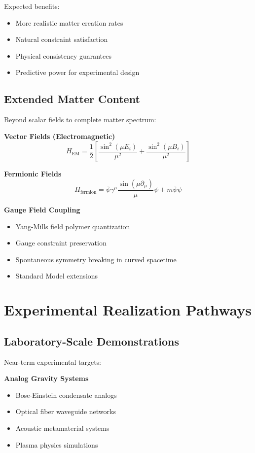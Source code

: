 \documentclass[11pt]{article}
\begin{document}
Expected benefits:
\begin{itemize}
\item More realistic matter creation rates
\item Natural constraint satisfaction
\item Physical consistency guarantees
\item Predictive power for experimental design
\end{itemize}

\subsection{Extended Matter Content}

Beyond scalar fields to complete matter spectrum:

\textbf{Vector Fields (Electromagnetic)}
\begin{equation}
H_{\text{EM}} = \frac{1}{2}\left[\frac{\sin^2(\mu E_i)}{\mu^2} + \frac{\sin^2(\mu B_i)}{\mu^2}\right]
\end{equation}

\textbf{Fermionic Fields}
\begin{equation}
H_{\text{fermion}} = \bar{\psi}\gamma^\mu \frac{\sin(\mu \partial_\mu)}{\mu}\psi + m\bar{\psi}\psi
\end{equation}

\textbf{Gauge Field Coupling}
\begin{itemize}
\item Yang-Mills field polymer quantization
\item Gauge constraint preservation
\item Spontaneous symmetry breaking in curved spacetime
\item Standard Model extensions
\end{itemize}

\section{Experimental Realization Pathways}

\subsection{Laboratory-Scale Demonstrations}

Near-term experimental targets:

\textbf{Analog Gravity Systems}
\begin{itemize}
\item Bose-Einstein condensate analogs
\item Optical fiber waveguide networks
\item Acoustic metamaterial systems
\item Plasma physics simulations
\end{itemize}
\end{document}
